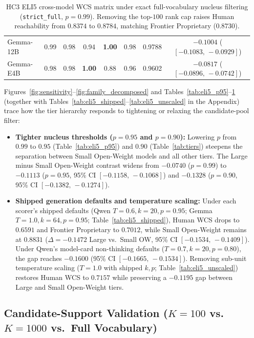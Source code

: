 \documentclass[11pt]{article}
\begin{document}
\begin{table}[t]
{\begin{tabular}{lccccccc}
Gemma-12B & 0.99 & 0.98 & 0.94 & \textbf{1.00} & 0.98 & 0.9788 & $-0.1004$ ($[-0.1083,\,-0.0929]$) \\
Gemma-E4B & 0.98 & 0.98 & \textbf{1.00} & 0.88 & 0.96 & 0.9602 & $-0.0817$ ($[-0.0896,\,-0.0742]$) \\
\bottomrule
\end{tabular}%
}
\caption{HC3 ELI5 cross-model WCS matrix under exact full-vocabulary nucleus filtering (\texttt{strict\_full}, $p=0.99$). Removing the top-$100$ rank cap raises Human reachability from $0.8374$ to $0.8784$, matching Frontier Proprietary ($0.8730$).}
\label{tab:eli5_strict_full}
\end{table}

Figures~\ref{fig:sensitivity}--\ref{fig:family_decomposed} and Tables~\ref{tab:eli5_p95}--\ref{tab:eli5_strict_full} (together with Tables~\ref{tab:eli5_shipped}--\ref{tab:eli5_unscaled} in the Appendix) trace how the tier hierarchy responds to tightening or relaxing the candidate-pool filter:
\begin{itemize}
    \item \textbf{Tighter nucleus thresholds ($p=0.95$ and $p=0.90$):} Lowering $p$ from $0.99$ to $0.95$ (Table~\ref{tab:eli5_p95}) and $0.90$ (Table~\ref{tab:tiers}) steepens the separation between Small Open-Weight models and all other tiers. The Large minus Small Open-Weight contrast widens from $-0.0740$ ($p=0.99$) to $-0.1113$ ($p=0.95$, 95\% CI $[-0.1158,\,-0.1068]$) and $-0.1328$ ($p=0.90$, 95\% CI $[-0.1382,\,-0.1274]$).
    \item \textbf{Shipped generation defaults and temperature scaling:} Under each scorer's shipped defaults (Qwen $T=0.6, k=20, p=0.95$; Gemma $T=1.0, k=64, p=0.95$; Table~\ref{tab:eli5_shipped}), Human WCS drops to $0.6591$ and Frontier Proprietary to $0.7012$, while Small Open-Weight remains at $0.8831$ ($\Delta = -0.1472$ Large vs.\ Small OW, 95\% CI $[-0.1534,\,-0.1409]$). Under Qwen's model-card non-thinking defaults ($T=0.7, k=20, p=0.80$), the gap reaches $-0.1600$ (95\% CI $[-0.1665,\,-0.1534]$). Removing sub-unit temperature scaling ($T=1.0$ with shipped $k,p$; Table~\ref{tab:eli5_unscaled}) restores Human WCS to $0.7157$ while preserving a $-0.1195$ gap between Large and Small Open-Weight tiers.
\end{itemize}

\subsection{Candidate-Support Validation ($K=100$ vs.\ $K=1000$ vs.\ Full Vocabulary)}
\end{document}
